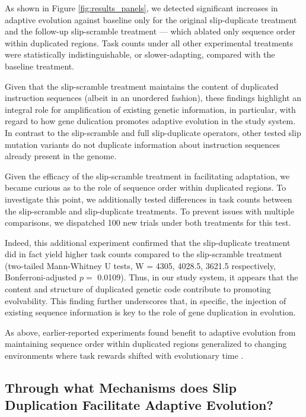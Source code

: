 As shown in Figure \ref{fig:results_panels}, we detected significant increases in adaptive evolution against baseline only for the original slip-duplicate treatment and the follow-up slip-scramble treatment --- which ablated only sequence order within duplicated regions.
Task counts under all other experimental treatments were statistically indistinguishable, or slower-adapting, compared with the baseline treatment.

Given that the slip-scramble treatment maintains the content of duplicated instruction sequences (albeit in an unordered fashion), these findings highlight an integral role for amplification of existing genetic information, in particular, with regard to how gene dulication promotes adaptive evolution in the study system.
In contrast to the slip-scramble and full slip-duplicate operators, other tested slip mutation variants do not duplicate information about instruction sequences already present in the genome.

Given the efficacy of the slip-scramble treatment in facilitating adaptation, we became curious as to the role of sequence order within duplicated regions.
To investigate this point, we additionally tested differences in task counts between the slip-scramble and slip-duplicate treatments.
To prevent issues with multiple comparisons, we dispatched 100 new trials under both treatments for this test.

Indeed, this additional experiment confirmed that the slip-duplicate treatment did in fact yield higher task counts compared to the slip-scramble treatment (two-tailed Mann-Whitney U tests, W = 4305, 4028.5, 3621.5 respectively, Bonferroni-adjusted $p =$ 0.0109).
Thus, in our study system, it appears that the content and structure of duplicated genetic code contribute to promoting evolvability.
This finding further underscores that, in specific, the injection of existing sequence information is key to the role of gene duplication in evolution.

As above, earlier-reported experiments found benefit to adaptive evolution from maintaining sequence order within duplicated regions generalized to changing environments where task rewards shifted with evolutionary time \citep{lalejini2017gene}.

\subsection{Through what Mechanisms does Slip Duplication Facilitate Adaptive Evolution?}

